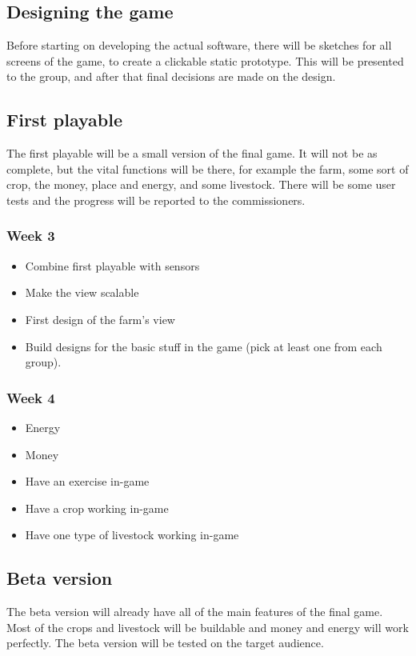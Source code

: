 \documentclass[a4paper,11pt,notitlepage]{report}
\begin{document}
\subsection{Designing the game}
Before starting on developing the actual software, there will be sketches for all screens of the game, to create a clickable static prototype. This will be presented to the group, and after that final decisions are made on the design.

\subsection{First playable}
The first playable will be a small version of the final game. It will not be as complete, but the vital functions will be there, for example the farm, some sort of crop, the money, place and energy, and some livestock. There will be some user tests and the progress will be reported to the commissioners.
\subsubsection{Week 3}
\begin{itemize}
\item Combine first playable with sensors
\item Make the view scalable
\item First design of the farm’s view
\item Build designs for the basic stuff in the game (pick at least one from each group).
\end{itemize}
\subsubsection{Week 4}
\begin{itemize}
\item Energy
\item Money
\item Have an exercise in-game
\item Have a crop working in-game
\item Have one type of livestock working in-game
\end{itemize}
\subsection{Beta version}
The beta version will already have all of the main features of the final game. Most of the crops and livestock will be buildable and money and energy will work perfectly. The beta version will be tested on the target audience.
\end{document}
